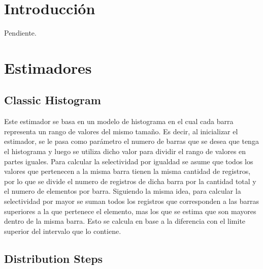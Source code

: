 \documentclass[a4paper, 10pt, twoside]{article}
\begin{document}
\newpage




\section{Introducción}

Pendiente.




\section{Estimadores}

\subsection{Classic Histogram}

Este estimador se basa en un modelo de histograma en el cual cada barra representa un rango
de valores del mismo tamaño.
Es decir, al inicializar el estimador, se le pasa como parámetro el numero de barras que se
desea que tenga el histograma
y luego se utiliza dicho valor para dividir el rango de valores en partes iguales.
Para calcular la selectividad por igualdad se asume que todos los valores que pertenecen a
la misma barra tienen la
 misma cantidad de registros, por lo que se divide el numero de registros de dicha barra
  por la cantidad total y el numero de elementos por barra.
Siguiendo la misma idea, para calcular la selectividad por mayor se suman todos los
registros que corresponden a las barras superiores a la que pertenece el elemento, mas los que se estima que son mayores dentro de la misma barra. Esto se calcula en base a la diferencia con el limite superior del intervalo que lo contiene.

\subsection{Distribution Steps}
\end{document}
